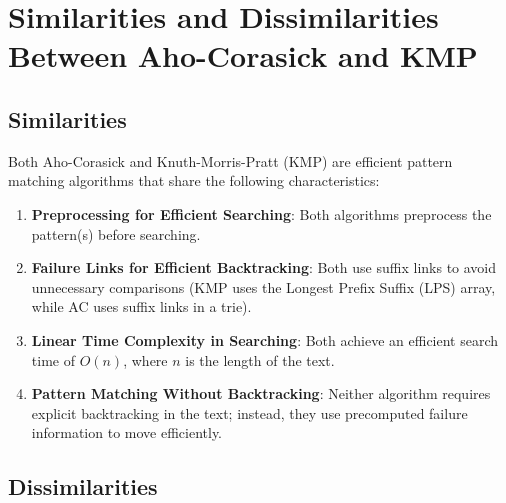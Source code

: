 \section{Similarities and Dissimilarities Between Aho-Corasick and KMP}
\subsection*{Similarities}
Both Aho-Corasick and Knuth-Morris-Pratt (KMP) are efficient pattern matching algorithms that share the following characteristics:

\begin{enumerate}
    \item \textbf{Preprocessing for Efficient Searching}:  
    Both algorithms preprocess the pattern(s) before searching.
    \item \textbf{Failure Links for Efficient Backtracking}:  
    Both use suffix links to avoid unnecessary comparisons (KMP uses the Longest Prefix Suffix (LPS) array, while AC uses suffix links in a trie).
    \item \textbf{Linear Time Complexity in Searching}:  
    Both achieve an efficient search time of \( O(n) \), where \( n \) is the length of the text.
    \item \textbf{Pattern Matching Without Backtracking}:  
    Neither algorithm requires explicit backtracking in the text; instead, they use precomputed failure information to move efficiently.
\end{enumerate}

\subsection*{Dissimilarities}

